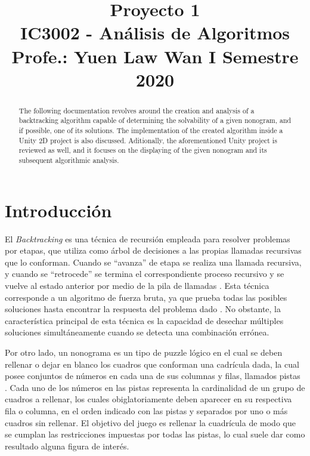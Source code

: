 \documentclass[conference]{IEEEtran}
\begin{document}
\title{Proyecto 1\\
{\footnotesize \textsuperscript{}IC3002 - Análisis de Algoritmos}
{\footnotesize \textsuperscript{}Profe.: Yuen Law Wan}
{\footnotesize \textsuperscript{}I Semestre 2020}
}

\author{
\and
{}
}

\maketitle

\begin{abstract}
The following documentation revolves around the creation and analysis of a backtracking algorithm capable of determining the solvability of a given nonogram, and if possible, one of its solutions. The implementation of the created algorithm inside a Unity 2D project is also discussed. Aditionally, the aforementioned Unity project is reviewed as well, and it focuses on the displaying of the given nonogram and its subsequent algorithmic analysis. 

\end{abstract}

\section{Introducción}
 El \textit{Backtracking} es una técnica de recursión empleada para resolver problemas por etapas, que utiliza como árbol de decisiones a las propias llamadas recursivas que lo conforman. Cuando se “avanza” de etapa se realiza una llamada recursiva, y cuando se “retrocede” se termina el correspondiente proceso recursivo y se vuelve al estado anterior por medio de la pila de llamadas . Esta técnica corresponde a un algoritmo de fuerza bruta, ya que prueba todas las posibles soluciones hasta encontrar la respuesta del problema dado \cite{b1}. No obstante, la característica principal de esta técnica es la capacidad de desechar múltiples soluciones simultáneamente cuando se detecta una combinación errónea.

Por otro lado, un nonograma es un tipo de puzzle lógico en el cual se deben rellenar o dejar en blanco los cuadros que conforman una cadrícula dada, la cual posee conjuntos de números en cada una de sus columnas y filas, llamados pistas \cite{b2}. Cada uno de los números en las pistas representa la cardinalidad de un grupo de cuadros a rellenar, los cuales obiglatoriamente deben aparecer en su respectiva fila o columna, en el orden
indicado con las pistas y separados por uno o más cuadros sin rellenar. El objetivo del juego es rellenar la cuadrícula de modo que se cumplan las restricciones impuestas por todas las pistas, lo cual suele dar como resultado alguna figura de interés.
\end{document}
